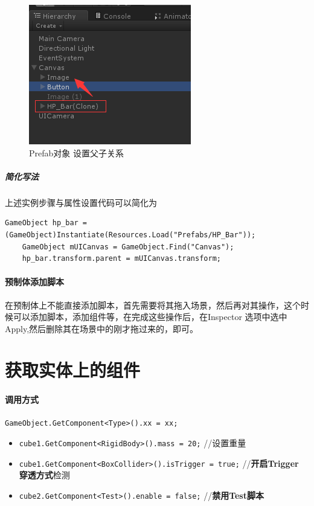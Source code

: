 \documentclass[UTF8,a4paper,12pt]{ctexbook}
\begin{document}
			  	\begin{figure}[H]
			  		\centering
			  		\includegraphics[scale=0.8]{Prefab-3.png}
			  		\caption{Prefab对象 设置父子关系}
			  	\end{figure}
		  	
		  		\subparagraph{简化写法}上述实例步骤与属性设置代码可以简化为
		  			\begin{lstlisting}[xleftmargin = .079\textwidth, frame = L]
	GameObject hp_bar = (GameObject)Instantiate(Resources.Load("Prefabs/HP_Bar"));
	GameObject mUICanvas = GameObject.Find("Canvas");
	hp_bar.transform.parent = mUICanvas.transform;	  				
		  			\end{lstlisting}
		  	
		  	\paragraph{预制体添加脚本}
		  		在预制体上不能直接添加脚本，首先需要将其拖入场景，然后再对其操作，这个时候可以添加脚本，添加组件等，在完成这些操作后，在Inspector 选项中选中 Apply,然后删除其在场景中的刚才拖过来的，即可。		
	\section{获取实体上的组件}
		\paragraph{调用方式}\verb|GameObject.GetComponent<Type>().xx = xx;|
			
			\begin{itemize}
				\item \verb|cube1.GetComponent<RigidBody>().mass = 20;| //设置重量
				\item \verb|cube1.GetComponent<BoxCollider>().isTrigger = true;| //\textbf{开启Trigger 穿透方式}检测
				\item \verb|cube2.GetComponent<Test>().enable = false;| //\textbf{禁用Test脚本}
			\end{itemize}
	
\end{document}
